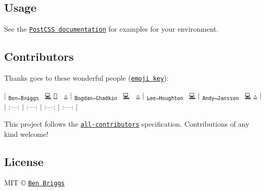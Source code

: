 \subsection*{Usage}

See the \href{https://github.com/postcss/postcss#usage}{\tt Post\+C\+SS documentation} for examples for your environment.

\subsection*{Contributors}

Thanks goes to these wonderful people (\href{https://github.com/kentcdodds/all-contributors#emoji-key}{\tt emoji key})\+:

$\vert$ \href{http://beneb.info}{\tt \textsubscript{Ben Briggs}}~\newline
\href{https://github.com/ben-eb/postcss-discard-duplicates/commits?author=ben-eb}{\tt 💻} \href{https://github.com/ben-eb/postcss-discard-duplicates/commits?author=ben-eb}{\tt 📖} 👀 \href{https://github.com/ben-eb/postcss-discard-duplicates/commits?author=ben-eb}{\tt ⚠️} $\vert$ \href{https://github.com/TrySound}{\tt \textsubscript{Bogdan Chadkin}}~\newline
\href{https://github.com/ben-eb/postcss-discard-duplicates/commits?author=TrySound}{\tt 💻} 👀 \href{https://github.com/ben-eb/postcss-discard-duplicates/commits?author=TrySound}{\tt ⚠️} $\vert$ \href{https://github.com/asztal}{\tt \textsubscript{Lee Houghton}}~\newline
\href{https://github.com/ben-eb/postcss-discard-duplicates/commits?author=asztal}{\tt 💻} $\vert$ \href{https://github.com/andyjansson}{\tt \textsubscript{Andy Jansson}}~\newline
\href{https://github.com/ben-eb/postcss-discard-duplicates/commits?author=andyjansson}{\tt 💻} \href{https://github.com/ben-eb/postcss-discard-duplicates/commits?author=andyjansson}{\tt ⚠️} $\vert$ $\vert$ \+:---\+: $\vert$ \+:---\+: $\vert$ \+:---\+: $\vert$ \+:---\+: $\vert$

This project follows the \href{https://github.com/kentcdodds/all-contributors}{\tt all-\/contributors} specification. Contributions of any kind welcome!

\subsection*{License}

M\+IT © \href{http://beneb.info}{\tt Ben Briggs} 